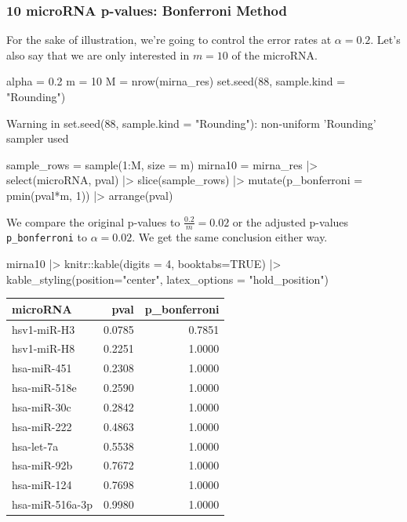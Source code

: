 \documentclass[a4paper]{article}\usepackage[]{graphicx}\usepackage[]{xcolor}
\begin{document}
\subsubsection{10 microRNA p-values: Bonferroni Method}
For the sake of illustration, we're going to control the error rates at \( \alpha = 0.2 \). Let's also say that we are only interested in \( m = 10 \) of the microRNA.
\begin{Schunk}
\begin{Sinput}
alpha = 0.2
m = 10
M = nrow(mirna_res)
set.seed(88, sample.kind = "Rounding")
\end{Sinput}
\begin{Soutput}
Warning in set.seed(88, sample.kind = "Rounding"): non-uniform 'Rounding' sampler used
\end{Soutput}
\begin{Sinput}
sample_rows = sample(1:M, size = m)
mirna10 = mirna_res |> 
  select(microRNA, pval) |> 
  slice(sample_rows) |> 
  mutate(p_bonferroni = pmin(pval*m, 1)) |> 
  arrange(pval)
\end{Sinput}
\end{Schunk}
We compare the original p-values to \( \frac{0.2}{m} = 0.02 \) or the adjusted p-values \lstinline|p_bonferroni| to \( \alpha = 0.02 \). We get the same conclusion either way.
\begin{Schunk}
\begin{Sinput}
mirna10 |> 
  knitr::kable(digits = 4, booktabs=TRUE) |>
    kable_styling(position="center", latex_options = "hold_position")
\end{Sinput}
\begin{table}[!h]
\centering
\begin{tabular}{lrr}
\toprule
microRNA & pval & p\_bonferroni\\
\midrule
hsv1-miR-H3 & 0.0785 & 0.7851\\
hsv1-miR-H8 & 0.2251 & 1.0000\\
hsa-miR-451 & 0.2308 & 1.0000\\
hsa-miR-518e & 0.2590 & 1.0000\\
hsa-miR-30c & 0.2842 & 1.0000\\
\addlinespace
hsa-miR-222 & 0.4863 & 1.0000\\
hsa-let-7a & 0.5538 & 1.0000\\
hsa-miR-92b & 0.7672 & 1.0000\\
hsa-miR-124 & 0.7698 & 1.0000\\
hsa-miR-516a-3p & 0.9980 & 1.0000\\
\bottomrule
\end{tabular}
\end{table}

\end{Schunk}
\end{document}
